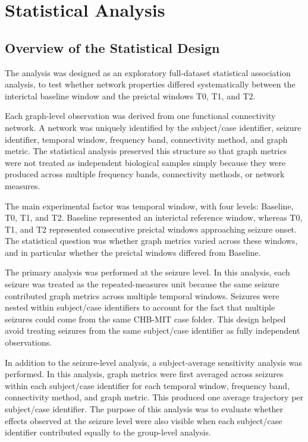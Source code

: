 \chapter{Statistical Analysis}
\label{chap:statistical-analysis}

\section{Overview of the Statistical Design}
\label{sec:statistical-design-overview}

The analysis was designed as an exploratory
full-dataset statistical association analysis, to test whether network properties differed systematically between
the interictal baseline window and the preictal windows T0, T1, and T2.

Each graph-level observation was derived from one functional connectivity
network. A network was uniquely identified by the subject/case identifier,
seizure identifier, temporal window, frequency band, connectivity method, and
graph metric. The statistical analysis preserved this structure so that graph
metrics were not treated as independent biological samples simply because they
were produced across multiple frequency bands, connectivity methods, or
network measures.

The main experimental factor was temporal window, with four levels:
Baseline, T0, T1, and T2. Baseline represented an interictal reference window,
whereas T0, T1, and T2 represented consecutive preictal windows approaching
seizure onset. The statistical question was whether graph metrics varied across
these windows, and in particular whether the preictal windows differed from
Baseline.

The primary analysis was performed at the seizure level. In this analysis,
each seizure was treated as the repeated-measures unit because the same seizure
contributed graph metrics across multiple temporal windows. Seizures were
nested within subject/case identifiers to account for the fact that multiple
seizures could come from the same CHB-MIT case folder. This design helped avoid
treating seizures from the same subject/case identifier as fully independent
observations.

In addition to the seizure-level analysis, a subject-average sensitivity
analysis was performed. In this analysis, graph metrics were first averaged
across seizures within each subject/case identifier for each temporal window,
frequency band, connectivity method, and graph metric. This produced one
average trajectory per subject/case identifier. The purpose of this analysis
was to evaluate whether effects observed at the seizure level were also visible
when each subject/case identifier contributed equally to the group-level
analysis.

